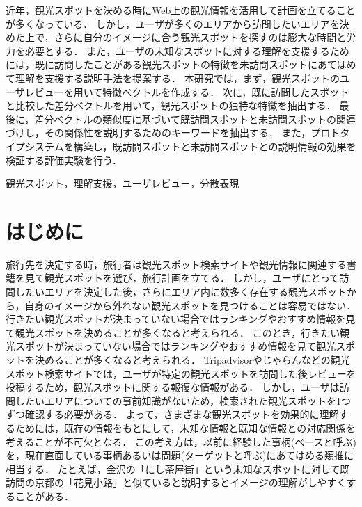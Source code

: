 \documentclass{deimj}
\begin{document}
\pagestyle{empty}
\begin{jabstract}
近年，観光スポットを決める時にWeb上の観光情報を活用して計画を立てることが多くなっている．
しかし，ユーザが多くのエリアから訪問したいエリアを決めた上で，さらに自分のイメージに合う観光スポットを探すのは膨大な時間と労力を必要とする．
また，ユーザの未知なスポットに対する理解を支援するためには，既に訪問したことがある観光スポットの特徴を未訪問スポットにあてはめて理解を支援する説明手法を提案する．
本研究では，まず，観光スポットのユーザレビューを用いて特徴ベクトルを作成する．
次に，既に訪問したスポットと比較した差分ベクトルを用いて，観光スポットの独特な特徴を抽出する．
最後に，差分ベクトルの類似度に基づいて既訪問スポットと未訪問スポットの関連づけし，その関係性を説明するためのキーワードを抽出する．
また，プロトタイプシステムを構築し，既訪問スポットと未訪問スポットとの説明情報の効果を検証する評価実験を行う．
\end{jabstract}

\begin{jkeyword}
観光スポット，理解支援，ユーザレビュー，分散表現
\end{jkeyword}
\maketitle


\section{はじめに}
\label{sec:はじめに}
旅行先を決定する時，旅行者は観光スポット検索サイトや観光情報に関連する書籍を見て観光スポットを選び，旅行計画を立てる．
しかし，ユーザにとって訪問したいエリアを決定した後，さらにエリア内に数多く存在する観光スポットから，自身のイメージから外れない観光スポットを見つけることは容易ではない．
行きたい観光スポットが決まっていない場合ではランキングやおすすめ情報を見て観光スポットを決めることが多くなると考えられる．
このとき，行きたい観光スポットが決まっていない場合ではランキングやおすすめ情報を見て観光スポットを決めることが多くなると考えられる．
Tripadvisorやじゃらんなどの観光スポット検索サイトでは，ユーザが特定の観光スポットを訪問した後レビューを投稿するため，観光スポットに関する報復な情報がある．
しかし，ユーザは訪問したいエリアについての事前知識がないため，検索された観光スポットを1つずつ確認する必要がある．
よって，さまざまな観光スポットを効果的に理解するためには，既存の情報をもとにして，未知な情報と既知な情報との対応関係を考えることが不可欠となる．
この考え方は，以前に経験した事柄(ベースと呼ぶ)を，現在直面している事柄あるいは問題(ターゲットと呼ぶ)にあてはめる類推に相当する．
たとえば，金沢の「にし茶屋街」という未知なスポットに対して既訪問の京都の「花見小路」と似ていると説明するとイメージの理解がしやすくすることがある．
\end{document}
